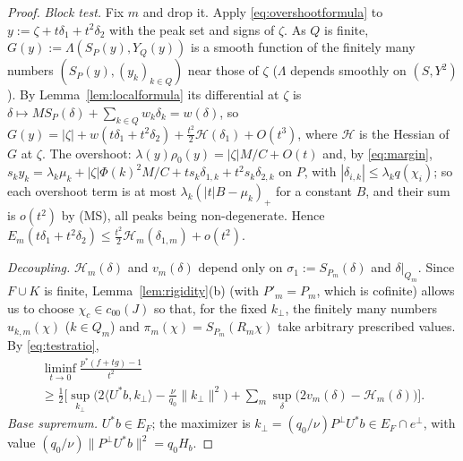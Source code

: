 \documentclass[10pt]{amsart}
\theoremstyle{definition}
\theoremstyle{remark}
\newcommand{\ip}[2]{\langle #1,#2\rangle}
\begin{document}
\begin{proof}
\emph{Block test.}  Fix $m$ and drop it.  Apply \eqref{eq:overshootformula}
to $y:=\zeta+t\delta_1+t^2\delta_2$ with the peak set and signs of $\zeta$.
As $Q$ is finite, $G(y):=\Lambda(S_P(y),Y_Q(y))$ is a smooth function of the
finitely many numbers $(S_P(y),(y_k)_{k\in Q})$ near those of $\zeta$
($\Lambda$ depends smoothly on $(S,Y^2)$).  By Lemma~\ref{lem:localformula}
its differential at $\zeta$ is $\delta\mapsto MS_P(\delta)+\sum_{k\in
Q}w_k\delta_k=w(\delta)$, so
$G(y)=|\zeta|+w(t\delta_1+t^2\delta_2)+\frac{t^2}2\mathcal H(\delta_1)+
O(t^3)$, where $\mathcal H$ is the Hessian of $G$ at $\zeta$.  The overshoot:
$\lambda(y)\rho_0(y)=|\zeta|M/C+O(t)$ and, by \eqref{eq:margin},
$s_ky_k=\lambda_k\mu_k+|\zeta|\Phi(k)^2M/C+ts_k\delta_{1,k}+t^2s_k
\delta_{2,k}$ on $P$, with $|\delta_{i,k}|\le\lambda_kq(\chi_i)$; so each
overshoot term is at most $\lambda_k(|t|B-\mu_k)_+$ for a constant $B$,
and their sum is $o(t^2)$ by (MS), all peaks being non-degenerate.  Hence
$E_m(t\delta_1+t^2\delta_2)\le\frac{t^2}2\mathcal H_m(\delta_{1,m})+o(t^2)$.

\emph{Decoupling.}  $\mathcal H_m(\delta)$ and $v_m(\delta)$ depend only on
$\sigma_1:=S_{P_m}(\delta)$ and $\delta|_{Q_m}$.  Since $F\cup K$ is finite,
Lemma~\ref{lem:rigidity}(b) (with $P'_m=P_m$, which is cofinite) allows us to
choose $\chi_c\in c_{00}(J)$ so that, for the fixed $k_\perp$, the finitely
many numbers $u_{k,m}(\chi)$ ($k\in Q_m$) and $\pi_m(\chi)=S_{P_m}(R_m\chi)$
take arbitrary prescribed values.  By \eqref{eq:testratio},
\begin{multline*}
 \liminf_{t\to0}\frac{p^*(f+tg)-1}{t^2}\\
 \ge\frac12\Big[\sup_{k_\perp}
 \Big(2\ip{U^*b}{k_\perp}-\frac{\nu}{q_0}\|k_\perp\|^2\Big)+\sum_m
 \sup_{\delta}\big(2v_m(\delta)-\mathcal H_m(\delta)\big)\Big].
\end{multline*}
\emph{Base supremum.}  $U^*b\in E_F$; the maximizer is
$k_\perp=(q_0/\nu)P^\perp U^*b\in E_F\cap e^\perp$, with value
$(q_0/\nu)\|P^\perp U^*b\|^2=q_0H_b$.


\end{proof}
\end{document}
